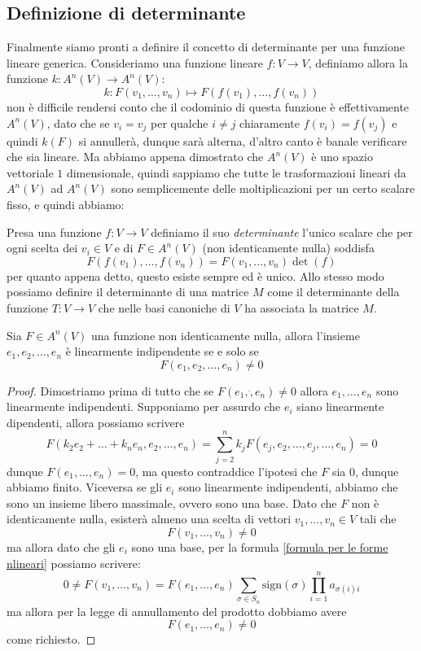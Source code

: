 \documentclass[11pt]{scrartcl}
\begin{document}
   	 \subsection{Definizione di determinante}
   	 Finalmente siamo pronti a definire il concetto di determinante per una funzione lineare generica. Consideriamo una funzione lineare $f:V\to V$, definiamo allora la funzione $k:A^n(V)\to A^n(V)$:
   	 $$k:F(v_1,\dots,v_n)\mapsto F(f(v_1),\dots,f(v_n))$$
   	 non è difficile rendersi conto che il codominio di questa funzione è effettivamente $A^n(V)$, dato che se $v_i=v_j$ per qualche $i\ne j$ chiaramente $f(v_i)=f(v_j)$ e quindi $k(F)$ si annullerà, dunque sarà alterna, d'altro canto è banale verificare che sia lineare. Ma abbiamo appena dimostrato che $A^n(V)$ è uno spazio vettoriale $1$ dimensionale, quindi sappiamo che tutte le trasformazioni lineari da $A^n(V)$ ad $A^n(V)$ sono semplicemente delle moltiplicazioni per un certo scalare fisso, e quindi abbiamo:
   	 \begin{definition}
   	 	Presa una funzione $f:V\to V$ definiamo il suo \textit{determinante} l'unico scalare che per ogni scelta dei $v_i\in V$ e di $F\in A^n(V)$ (non identicamente nulla) soddisfa
   	 	$$F(f(v_1),\dots,f(v_n))=F(v_1,\dots,v_n)\det(f)$$
   	 	per quanto appena detto, questo esiste sempre ed è unico. Allo stesso modo possiamo definire il determinante di una matrice $M$ come il determinante della funzione $T:V\to V$ che nelle basi canoniche di $V$ ha associata la matrice $M$.
   	 \end{definition}
   	 \begin{lemma}\label{Comportamento delle funzioni alterne e lineari rispetto agli insiemi liberi}
   	 	Sia $F\in A^n(V)$ una funzione non identicamente nulla, allora l'insieme $e_1,e_2,\dots,e_n$ è linearmente indipendente se e solo se 
   	 	$$F(e_1,e_2,\dots,e_n)\ne 0$$
   	 \end{lemma}
   	 \begin{proof}
   	 	Dimostriamo prima di tutto che se $F(e_1,\dot,e_n)\ne 0$ allora $e_1,\dots, e_n$ sono linearmente indipendenti. Supponiamo per assurdo che $e_i$ siano linearmente dipendenti, allora possiamo scrivere
   	 	$$F(k_2e_2+\dots+k_ne_n,e_2,\dots,e_n)=\sum_{j=2}^n k_jF(e_j,e_2,\dots,e_j,\dots,e_n)=0$$ 
   	 	dunque $F(e_1,\dots,e_n)=0$, ma questo contraddice l'ipotesi che $F$ sia $0$, dunque abbiamo finito. Viceversa se gli $e_i$ sono linearmente indipendenti, abbiamo che sono un insieme libero massimale, ovvero sono una base. Dato che $F$ non è identicamente nulla, esisterà almeno una scelta di vettori $v_1,\dots,v_n\in V$ tali che 
   	 	$$F(v_1,\dots,v_n)\ne 0$$
   	 	ma allora dato che gli $e_i$ sono una base, per la formula \ref{formula per le forme nlineari} possiamo scrivere:
   	 	$$0\ne F(v_1,\dots,v_n)=F(e_1,\dots,e_n)\sum_{\sigma\in S_n}\text{sign}(\sigma)\prod_{i=1}^{n}a_{\sigma(i)i}$$
   	 	ma allora per la legge di annullamento del prodotto dobbiamo avere
   	 	$$F(e_1,\dots,e_n)\ne 0$$
   	 	come richiesto.
   	 \end{proof}
\end{document}
